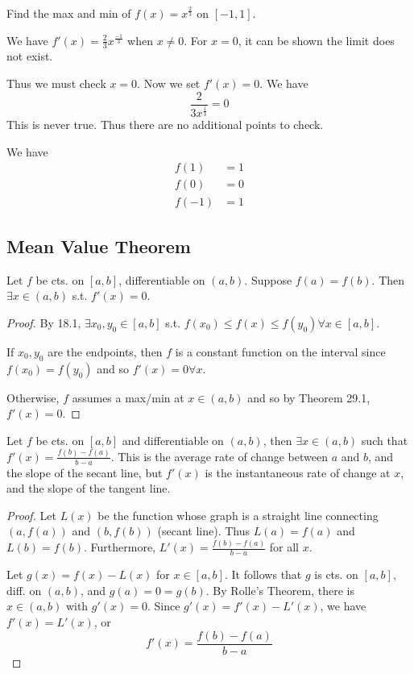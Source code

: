 \documentclass{article}
\begin{document}
\begin{example}
    Find the max and min of $f(x) = x^{\frac{2}{3}}$ on $[-1, 1]$.

    We have $f'(x) = \frac{2}{3}x^{\frac{-1}{3}}$ when $x \neq 0$. For $x = 0$, it can be shown the limit does not exist.

    Thus we must check $x = 0$. Now we set $f'(x) = 0$. We have \[
    \frac{2}{3x^{\frac{1}{3}}} = 0
    \]
    This is never true. Thus there are no additional points to check.

    We have \begin{align*}
        f(1) &= 1\\
        f(0) &= 0\\
        f(-1) &= 1
    \end{align*}
\end{example}
\subsection{Mean Value Theorem}
\begin{cthm}
    Let $f$ be cts. on $[a, b]$, differentiable on $(a, b)$. Suppose $f(a) = f(b)$. Then $\exists x \in (a, b)$ s.t. $f'(x) = 0$.
\end{cthm}
\begin{proof}
    By 18.1, $\exists x_0, y_0 \in [a,b]$ s.t. $f(x_0) \leq f(x) \leq f(y_0) \forall x \in [a,b]$. 

    If $x_0, y_0$ are the endpoints, then $f$ is a constant function on the interval since $f(x_0) = f(y_0)$ and so $f'(x) = 0 \forall x$.

    Otherwise, $f$ assumes a max/min at $x \in (a, b)$ and so by Theorem 29.1, $f'(x) = 0$.
\end{proof}
\begin{cthm}
    Let $f$ be cts. on $[a, b]$ and differentiable on $(a, b)$, then $\exists x \in (a, b)$ such that $f'(x) = \frac{f(b) - f(a)}{b-a}$. This is the average rate of change between $a$ and $b$, and the slope of the secant line, but $f'(x)$ is the instantaneous rate of change at $x$, and the slope of the tangent line.
\end{cthm}
\begin{proof}
    Let $L(x)$ be the function whose graph is a straight line connecting $(a, f(a))$ and $(b, f(b))$ (secant line). Thus $L(a) = f(a)$ and $L(b) = f(b)$. Furthermore, $L'(x) = \frac{f(b) - f(a)}{b-a}$ for all $x$. 

    Let $g(x) = f(x) - L(x)$ for $x \in [a, b]$. It follows that $g$ is cts. on $[a, b]$, diff. on $(a, b)$, and $g(a) = 0 = g(b)$. By Rolle's Theorem, there is $x \in (a, b)$ with $g'(x) = 0$. Since $g'(x) = f'(x) - L'(x)$, we have $f'(x) = L'(x)$, or \[
    f'(x) = \frac{f(b) - f(a)}{b-a}
    \] 
\end{proof}
\end{document}
